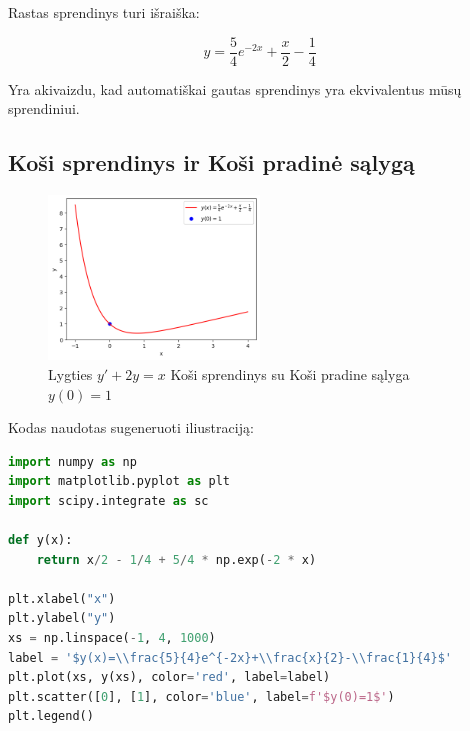 \documentclass[11pt]{article}
\begin{document}
Rastas sprendinys turi išraiška:

\begin{equation}
y=\frac{5}{4}e^{-2x}+\frac{x}{2}-\frac{1}{4}
\end{equation}

Yra akivaizdu, kad automatiškai gautas sprendinys yra ekvivalentus mūsų sprendiniui.

\subsection*{Koši sprendinys ir Koši pradinė sąlygą}

\begin{figure}[h!]
    \centering
    \includegraphics[width=0.5\textwidth]{3-updated.png}
    \caption{Lygties $y'+2y=x$ Koši sprendinys su Koši pradine sąlyga $y(0)=1$}
    \label{fig:pvz3}
\end{figure}

\newpage
Kodas naudotas sugeneruoti iliustraciją:

\begin{lstlisting}[language=Python]
import numpy as np
import matplotlib.pyplot as plt
import scipy.integrate as sc

def y(x):
    return x/2 - 1/4 + 5/4 * np.exp(-2 * x)

plt.xlabel("x")
plt.ylabel("y")
xs = np.linspace(-1, 4, 1000)
label = '$y(x)=\\frac{5}{4}e^{-2x}+\\frac{x}{2}-\\frac{1}{4}$'
plt.plot(xs, y(xs), color='red', label=label)
plt.scatter([0], [1], color='blue', label=f'$y(0)=1$')
plt.legend()
\end{lstlisting}
\end{document}
